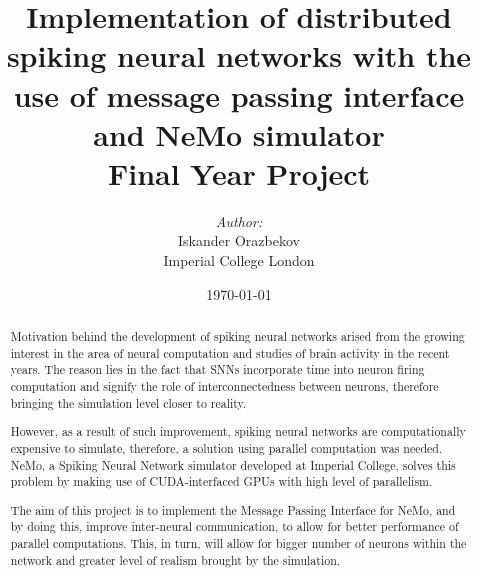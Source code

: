 \documentclass[12pt]{report}
\title{\LARGE Implementation of distributed spiking neural networks with the use of message passing interface and NeMo simulator \\ \vspace{7mm} \large Final Year Project}
\author{ \emph{Author:} \\ Iskander Orazbekov \vspace{56 mm} \\ Imperial College London}
\date{\today}
\begin{document}
\maketitle

\begin{abstract}

Motivation behind the development of spiking neural networks arised from the growing interest in the area of neural 
computation and studies of brain activity in the recent years. The reason lies in the fact that SNNs incorporate time
into neuron firing computation and signify the role of interconnectedness between neurons, therefore bringing the simulation 
level closer to reality.

However, as a result of such improvement, spiking neural networks are computationally expensive to simulate, therefore, a solution 
using parallel computation was needed. NeMo, a Spiking Neural Network simulator developed at Imperial College, solves this problem 
by making use of CUDA-interfaced GPUs with high level of parallelism.

The aim of this project is to implement the Message Passing Interface for NeMo, and by doing this, improve inter-neural communication, 
to allow for better performance of parallel computations. This, in turn, will allow for bigger number of neurons within the network 
and greater level of realism brought by the simulation.

\end{abstract}

\tableofcontents

\renewcommand{\chaptername}{}















\clearpage



\end{document}

